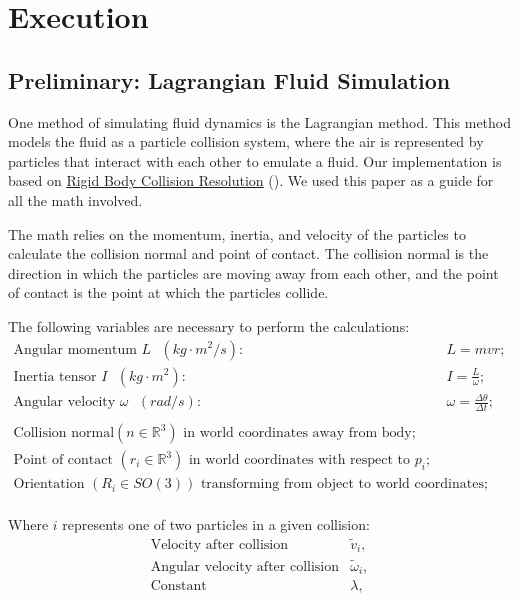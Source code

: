 \documentclass[a4paper,12pt]{article}
\begin{document}
\section{Execution}
\subsection{Preliminary: Lagrangian Fluid Simulation}
One method of simulating fluid dynamics is the Lagrangian method. This method
models the fluid as a particle collision system, where the air is represented by
particles that interact with each other to emulate a fluid. Our implementation
is based on \hyperlink{http://www.hakenberg.de/diffgeo/collision_resolution.htm}{Rigid Body Collision Resolution}
(\cite{hakenberg}). We used this paper as a guide for all the math involved.

The math relies on the momentum, inertia, and velocity of the particles to
calculate the collision normal and point of contact. The collision normal is
the direction in which the particles are moving away from each other, and the
point of contact is the point at which the particles collide.

The following variables are necessary to perform the calculations:
\[
\begin{array}{ll}
	\text{Angular momentum $L$ } (kg\cdot m^2/s): & L = mvr; \\
	\text{Inertia tensor $I$ } (kg\cdot m^2): & I = \frac{L}{\omega}; \\
    \text{Angular velocity $\omega$ } (rad/s): & \omega = \frac{\Delta \theta}{\Delta t}; \\

	\\

	\text{Collision normal} (n \in \mathbb{R}^3) \text{ in world coordinates away from body}; \\
	\text{Point of contact } (r_i \in \mathbb{R}^3) \text{ in world coordinates with respect to $p_i$}; \\
	\text{Orientation } (R_i \in SO(3)) \text{ transforming from object to world coordinates}; \\
\end{array}
\]

Where $i$ represents one of two particles in a given collision:
\[
\begin{array}{ll}
	\text{Velocity after collision} & \tilde{v}_i, \\ 
	\text{Angular velocity after collision} & \tilde{\omega}_i, \\
	\text{Constant} & \lambda, \\
\end{array}
\]
\end{document}
